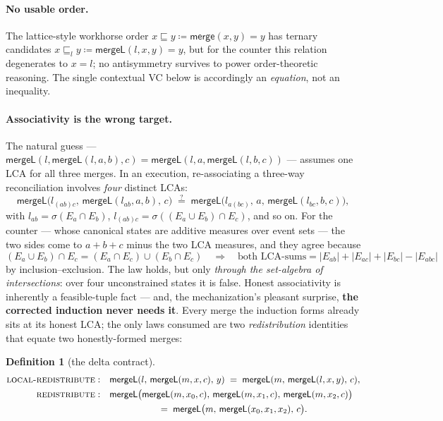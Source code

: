 \documentclass[11pt]{article}
\newtheorem{definition}[theorem]{Definition}
\newcommand{\Merge}{\mathsf{merge}}
\newcommand{\mergeL}{\mathsf{mergeL}}
\begin{document}
\paragraph{No usable order.} The lattice-style workhorse order
$x \sqsubseteq y \coloneqq \Merge(x,y) = y$ has ternary candidates
$x \sqsubseteq_l y \coloneqq \mergeL(l,x,y) = y$, but for the counter this
relation degenerates to $x = l$; no antisymmetry survives to power
order-theoretic reasoning. The single
contextual VC below is accordingly an \emph{equation}, not an inequality.

\paragraph{Associativity is the wrong target.} The natural guess ---
$\mergeL(l,\mergeL(l,a,b),c) = \mergeL(l,a,\mergeL(l,b,c))$ --- assumes
one LCA for all three merges. In an execution, re-associating a three-way
reconciliation involves \emph{four} distinct LCAs:
\[
  \mergeL\bigl(l_{(ab)c},\, \mergeL(l_{ab}, a, b),\, c\bigr)
  \;\overset{?}{=}\;
  \mergeL\bigl(l_{a(bc)},\, a,\, \mergeL(l_{bc}, b, c)\bigr),
\]
with $l_{ab} = \sigma(E_a \cap E_b)$, $l_{(ab)c} = \sigma((E_a \cup E_b)
\cap E_c)$, and so on. For the counter --- whose canonical states are
additive measures over event sets --- the two sides come to $a+b+c$ minus
the two LCA measures, and they agree because
\[
  (E_a \cup E_b) \cap E_c = (E_a \cap E_c) \cup (E_b \cap E_c)
  \quad\Longrightarrow\quad
  \text{both LCA-sums} = |E_{ab}| + |E_{ac}| + |E_{bc}| - |E_{abc}|
\]
by inclusion--exclusion. The law holds, but only \emph{through the
set-algebra of intersections}: over four unconstrained states it is false.
Honest associativity is inherently a feasible-tuple fact --- and, the
mechanization's pleasant surprise, \textbf{the corrected induction never
needs it}. Every merge the induction forms already sits at its honest LCA;
the only laws consumed are two \emph{redistribution} identities that
equate two honestly-formed merges:

\begin{definition}[the delta contract]
\label{def:delta}
\begin{align*}
\textsc{local-redistribute}:&\quad
  \mergeL(l,\, \mergeL(m, x, c),\, y) \;=\; \mergeL(m,\, \mergeL(l, x,
  y),\, c),\\
\textsc{redistribute}:&\quad
  \mergeL\bigl(\mergeL(m,x_0,c),\, \mergeL(m,x_1,c),\, \mergeL(m,x_2,c)\bigr)\\
  &\qquad\qquad\qquad\;=\; \mergeL\bigl(m,\, \mergeL(x_0,x_1,x_2),\, c\bigr).
\end{align*}
\end{definition}
\end{document}

